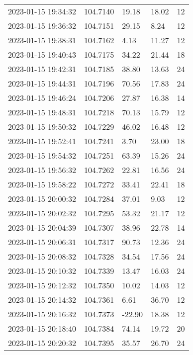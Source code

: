 \documentclass{nature_plusfigure}
\begin{document}
\begin{supplement}
\begin{center}
\begin{longtable}{lllll}
2023-01-15 19:34:32 & 104.7140 & 19.18 & 18.02 & 12 \\ 
2023-01-15 19:36:32 & 104.7151 & 29.15 & 8.24 & 12 \\ 
2023-01-15 19:38:31 & 104.7162 & 4.13 & 11.27 & 12 \\ 
2023-01-15 19:40:43 & 104.7175 & 34.22 & 21.44 & 18 \\ 
2023-01-15 19:42:31 & 104.7185 & 38.80 & 13.63 & 24 \\ 
2023-01-15 19:44:31 & 104.7196 & 70.56 & 17.83 & 24 \\ 
2023-01-15 19:46:24 & 104.7206 & 27.87 & 16.38 & 14 \\ 
2023-01-15 19:48:31 & 104.7218 & 70.13 & 15.79 & 12 \\ 
2023-01-15 19:50:32 & 104.7229 & 46.02 & 16.48 & 12 \\ 
2023-01-15 19:52:41 & 104.7241 & 3.70 & 23.00 & 18 \\ 
2023-01-15 19:54:32 & 104.7251 & 63.39 & 15.26 & 24 \\ 
2023-01-15 19:56:32 & 104.7262 & 22.81 & 16.56 & 24 \\ 
2023-01-15 19:58:22 & 104.7272 & 33.41 & 22.41 & 18 \\ 
2023-01-15 20:00:32 & 104.7284 & 37.01 & 9.03 & 12 \\ 
2023-01-15 20:02:32 & 104.7295 & 53.32 & 21.17 & 12 \\ 
2023-01-15 20:04:39 & 104.7307 & 38.96 & 22.78 & 14 \\ 
2023-01-15 20:06:31 & 104.7317 & 90.73 & 12.36 & 24 \\ 
2023-01-15 20:08:32 & 104.7328 & 34.54 & 17.56 & 24 \\ 
2023-01-15 20:10:32 & 104.7339 & 13.47 & 16.03 & 24 \\ 
2023-01-15 20:12:32 & 104.7350 & 10.02 & 14.03 & 12 \\ 
2023-01-15 20:14:32 & 104.7361 & 6.61 & 36.70 & 12 \\ 
2023-01-15 20:16:32 & 104.7373 & -22.90 & 18.38 & 12 \\ 
2023-01-15 20:18:40 & 104.7384 & 74.14 & 19.72 & 20 \\ 
2023-01-15 20:20:32 & 104.7395 & 35.57 & 26.70 & 24 \\ 
\hline 
\end{longtable} 
\end{center} 




\end{supplement}
\end{document}
